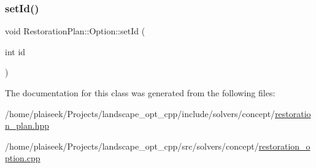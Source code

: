 \mbox{\label{class_restoration_plan_1_1_option_a2434271320cdaf7976da04226a8f208b}} 
\subsubsection{\texorpdfstring{set\+Id()}{setId()}}
{\footnotesize\ttfamily void Restoration\+Plan\+::\+Option\+::set\+Id (\begin{DoxyParamCaption}\item[{int}]{id }\end{DoxyParamCaption})}



The documentation for this class was generated from the following files\+:\begin{DoxyCompactItemize}
\item 
/home/plaiseek/\+Projects/landscape\+\_\+opt\+\_\+cpp/include/solvers/concept/\hyperlink{restoration__plan_8hpp}{restoration\+\_\+plan.\+hpp}\item 
/home/plaiseek/\+Projects/landscape\+\_\+opt\+\_\+cpp/src/solvers/concept/\hyperlink{restoration__option_8cpp}{restoration\+\_\+option.\+cpp}\end{DoxyCompactItemize}
